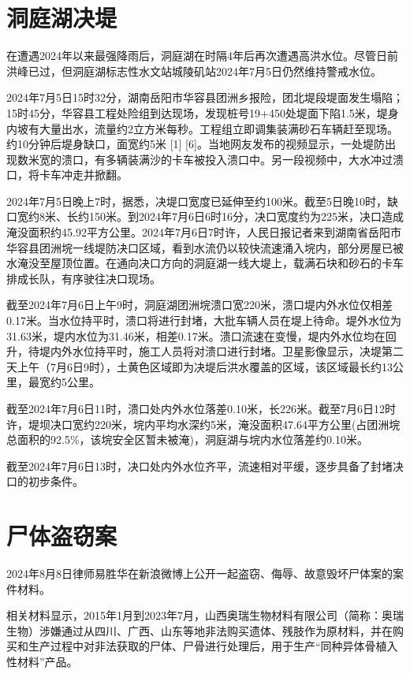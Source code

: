 \section{洞庭湖决堤}

在遭遇2024年以来最强降雨后，洞庭湖在时隔4年后再次遭遇高洪水位。尽管日前洪峰已过，但洞庭湖标志性水文站城陵矶站2024年7月5日仍然维持警戒水位。

2024年7月5日15时32分，湖南岳阳市华容县团洲乡报险，团北堤段堤面发生塌陷；15时45分，华容县工程处险组到达现场，发现桩号19+450处堤面下陷1.5米，堤身内坡有大量出水，流量约2立方米每秒。工程组立即调集装满砂石车辆赶至现场。约10分钟后堤身缺口，面宽约5米 [1] [6]。当地网友发布的视频显示，一处堤防出现数米宽的溃口，有多辆装满沙的卡车被投入溃口中。另一段视频中，大水冲过溃口，将卡车冲走并掀翻。

2024年7月5日晚上7时，据悉，决堤口宽度已延伸至约100米。截至5日晚10时，缺口宽约8米、长约150米。到2024年7月6日6时16分，决口宽度约为225米，决口造成淹没面积约45.92平方公里。2024年7月6日7时许，人民日报记者来到湖南省岳阳市华容县团洲垸一线堤防决口区域，看到水流仍以较快流速涌入垸内，部分房屋已被水淹没至屋顶位置。在通向决口方向的洞庭湖一线大堤上，载满石块和砂石的卡车排成长队，有序驶往决口现场。

截至2024年7月6日上午9时，洞庭湖团洲垸溃口宽220米，溃口堤内外水位仅相差0.17米。当水位持平时，溃口将进行封堵，大批车辆人员在堤上待命。堤外水位为31.63米，堤内水位为31.46米，相差0.17米。溃口流速在变慢，堤内外水位均在回升，待堤内外水位持平时，施工人员将对溃口进行封堵。卫星影像显示，决堤第二天上午（7月6日9时），土黄色区域即为决堤后洪水覆盖的区域，该区域最长约13公里，最宽约5公里。

截至2024年7月6日11时，溃口处内外水位落差0.10米，长226米。截至7月6日12时许，堤坝决口宽约220米，垸内平均水深约5米，淹没面积47.64平方公里(占团洲垸总面积的92.5\%，该垸安全区暂未被淹)，洞庭湖与垸内水位落差约0.10米。

截至2024年7月6日13时，决口处内外水位齐平，流速相对平缓，逐步具备了封堵决口的初步条件。

\section{尸体盗窃案}

2024年8月8日律师易胜华在新浪微博上公开一起盗窃、侮辱、故意毁坏尸体案的案件材料。

相关材料显示，2015年1月到2023年7月，山西奥瑞生物材料有限公司（简称：奥瑞生物）涉嫌通过从四川、广西、山东等地非法购买遗体、残肢作为原材料，并在购买和生产过程中对非法获取的尸体、尸骨进行处理后，用于生产“同种异体骨植入性材料”产品。

